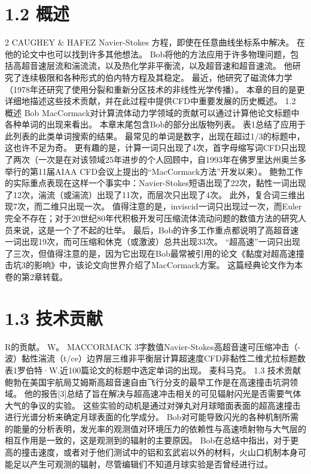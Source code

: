 \documentclass[UTF8,11pt,a4paper,openany,fontset=fandol]{ctexbook}
\begin{document}
\section{1.2 概述}
2 CAUGHEY \& HAFEZ Navier-Stokes 方程，即使在任意曲线坐标系中解决。 在他的论文中也可以找到许多其他想法。 Bob将他的方法应用于许多物理问题，包括高超音速层流和湍流流，以及热化学非平衡流，以及超音速和超音速流。 他研究了连续极限和各种形式的伯内特方程及其稳定。 最近，他研究了磁流体力学（1978年还研究了使用分裂和重新分区技术的非线性光学传播）。 本章的目的是更详细地描述这些技术贡献，并在此过程中提供CFD中重要发展的历史概述。 1.2 概述 Bob MacCormack对计算流体动力学领域的贡献可以通过计算他论文标题中各种单词的出现来看出。 本章末尾包含Bob的部分出版物列表。 表1总结了应用于此列表的此类单词搜索的结果。 最常见的单词是数字，出现在超过1/3的标题中，这也许不足为奇。 更有趣的是，计算一词只出现了4次，首字母缩写词CFD只出现了两次（一次是在对该领域25年进步的个人回顾中，自1993年在佛罗里达州奥兰多举行的第11届AIAA CFD会议上提出的“MacCormack方法”开发以来）。 鲍勃工作的实际重点表现在这样一个事实中：Navier-Stokes短语出现了22次，黏性一词出现了12次，湍流（或湍流）出现了11次，而层次只出现了4次。 此外，复合词三维出现7次，而二维只出现一次。 值得注意的是，inviscid一词只出现过一次，而Euler完全不存在；对于20世纪80年代积极开发可压缩流体流动问题的数值方法的研究人员来说，这是一个了不起的壮举。 最后，Bob的许多工作重点都说明了高超音速一词出现19次，而可压缩和休克（或激波）总共出现33次。 “超高速”一词只出现了三次，但值得注意的是，因为它出现在Bob最常被引用的论文《黏度对超高速撞击坑3的影响》中，该论文向世界介绍了MacCormack方案。 这篇经典论文作为本卷的第2章转载。

\section{1.3 技术贡献}
R的贡献。 W。 MACCORMACK 3字数值Navier-Stokes高超音速可压缩冲击（-波）黏性湍流（t/ce）边界层三维非平衡层计算超速度CFD非黏性二维尤拉标题数表1罗伯特·W.近100篇论文的标题中选定单词的出现。 麦科马克。 1.3 技术贡献 鲍勃在美国宇航局艾姆斯高超音速自由飞行分支的最早工作是在高速撞击坑洞领域。 他的报告[3]总结了旨在解决与超高速冲击相关的可见辐射闪光是否需要气体大气的争议的实验。 这些实验的动机是通过对弹丸对月球暗面表面的超高速撞击进行光谱分析来确定月球表面的化学成分。 Bob对可能导致闪光的各种机制所需的能量的分析表明，发光率的观测值对环境压力的依赖性与高速喷射物与大气层的相互作用是一致的，这是观测到的辐射的主要原因。 Bob在总结中指出，对于更高的撞击速度，或者对于他们测试中的铝和玄武岩以外的材料，火山口机制本身可能足以产生可观测的辐射，尽管编辑们不知道月球实验是否曾经进行过。
\end{document}
